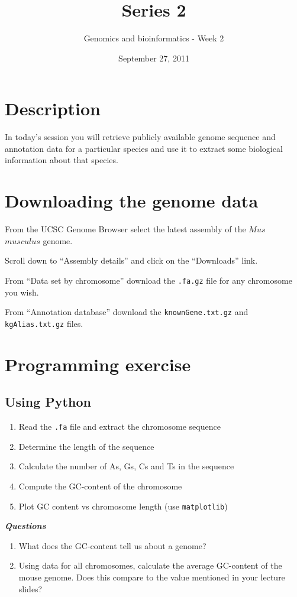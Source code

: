 \documentclass[a4paper,11pt]{article}
\title{Series 2}
\date{September 27, 2011}
\author{Genomics and bioinformatics - Week 2}
\begin{document}
\maketitle

\section{Description}
In today's session you will retrieve publicly available genome sequence and annotation data
\indent for a particular species and use it to extract some biological information about that species.

\section{Downloading the genome data}
From the UCSC Genome Browser select the latest assembly of the $Mus$ $musculus$ genome.

Scroll down to ``Assembly details'' and click on the ``Downloads'' link.

From ``Data set by chromosome'' download the \texttt{.fa.gz} file for any chromosome you wish.

From ``Annotation database'' download the \texttt{knownGene.txt.gz} and \texttt{kgAlias.txt.gz} files.

\section{Programming exercise}

\subsection{Using Python}
\begin{enumerate}
\item Read the \texttt{.fa} file and extract the chromosome sequence
\item Determine the length of the sequence
\item Calculate the number of As, Gs, Cs and Ts in the sequence
\item Compute the GC-content of the chromosome
\item Plot GC content vs chromosome length (use  \texttt{matplotlib})
\end{enumerate}

\Large{\emph\bf Questions}
\begin{enumerate}
\normalsize\item What does the GC-content tell us about a genome?
\item Using data for all chromosomes, calculate the average GC-content of the mouse genome. Does this compare to the value mentioned in your lecture slides?
\end{enumerate}
\end{document}

